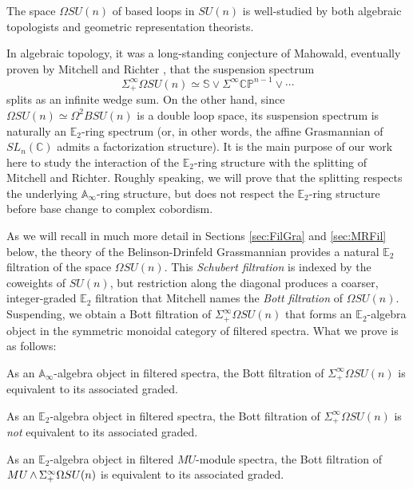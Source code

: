 The space $\Omega SU(n)$ of based loops in $SU(n)$ is well-studied by both algebraic topologists and geometric representation theorists.

In algebraic topology, it was a long-standing conjecture of Mahowald, eventually proven by Mitchell and Richter \cite[Theorem 2.1]{CrabbMitchell}, that the suspension spectrum 
$$\Sigma^{\infty}_+ \Omega SU(n) \simeq \mathbb{S} \vee \Sigma^{\infty} \mathbb{CP}^{n-1} \vee \cdots$$
splits as an infinite wedge sum.  On the other hand, since $\Omega SU(n) \simeq \Omega^2 BSU(n)$ is a double loop space, its suspension spectrum is naturally an $\mathbb{E}_2$-ring spectrum (or, in other words, the affine Grasmannian of $SL_n(\mathbb{C})$ admits a factorization structure).  It is the main purpose of our work here to study the interaction of the $\mathbb{E}_2$-ring structure with the splitting of Mitchell and Richter.  Roughly speaking, we will prove that the splitting respects the underlying $\mathbb{A}_\infty$-ring structure, but does not respect the $\mathbb{E}_2$-ring structure before base change to complex cobordism.

As we will recall in much more detail in Sections \ref{sec:FilGra} and \ref{sec:MRFil} below, the theory of the Belinson-Drinfeld Grassmannian provides a natural $\mathbb{E}_2$ filtration of the space $\Omega SU(n)$.  This \textit{Schubert filtration} is indexed by the coweights of $SU(n)$, but restriction along the diagonal produces a coarser, integer-graded $\mathbb{E}_2$ filtration that Mitchell names the \textit{Bott filtration} of $\Omega SU(n)$.  Suspending, we obtain a Bott filtration of $\Sigma^{\infty}_+ \Omega SU(n)$ that forms an $\mathbb{E}_2$-algebra object in the symmetric monoidal category of filtered spectra.  What we prove is as follows:

\begin{thm} \label{thm:MainAoo}
As an $\mathbb{A}_\infty$-algebra object in filtered spectra, the Bott filtration of $\Sigma^{\infty}_+ \Omega SU(n)$ is equivalent to its associated graded.
\end{thm}
\begin{thm} \label{thm:MainObstruction}
As an $\mathbb{E}_2$-algebra object in filtered spectra, the Bott filtration of $\Sigma^{\infty}_+ \Omega SU(n)$ is \textit{not} equivalent to its associated graded.
\end{thm}
\begin{thm} \label{thm:MainMUE2}
As an $\mathbb{E}_2$-algebra object in filtered $MU$-module spectra, the Bott filtration of $MU \operatorname{\wedge} \Sigma^{\infty}_+ \Omega SU(n)$ is equivalent to its associated graded.
\end{thm}

